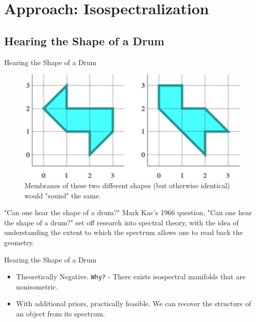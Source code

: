 \documentclass{beamer}
\begin{document}
\section{Approach: Isospectralization}

\subsection{Hearing the Shape of a Drum}

\begin{frame}{Hearing the Shape of a Drum}

\begin{figure}
    \centering
    \includegraphics[height=0.2\textwidth]{Indenticalshapes.png}
    \caption{Membranes of these two different shapes (but otherwise identical) would "sound" the same.}
    \label{fig:Identicalshapes}
\end{figure}

\begin{block} {"Can one hear the shape of a drum?"}
    Mark Kac's 1966 question, "Can one hear the shape of a drum?" set off research into spectral theory, with the idea of understanding the extent to which the spectrum allows one to read back the geometry. 
\end{block}


\end{frame}

\begin{frame}{Hearing the Shape of a Drum}

\begin{itemize}
    \item Theoretically Negative. \texttt{Why?} - There exists isospectral manifolds that are nonisometric.
    \item With additional priors, practically feasible. We can recover the structure of an object from its spectrum.
    
\end{itemize}
    
\end{frame}

\end{document}
